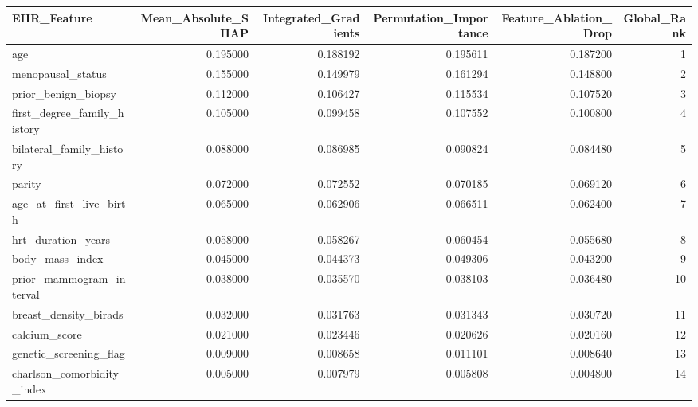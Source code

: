 \begin{tabular}{lrrrrr}
\toprule
EHR_Feature & Mean_Absolute_SHAP & Integrated_Gradients & Permutation_Importance & Feature_Ablation_Drop & Global_Rank \\
\midrule
age & 0.195000 & 0.188192 & 0.195611 & 0.187200 & 1 \\
menopausal_status & 0.155000 & 0.149979 & 0.161294 & 0.148800 & 2 \\
prior_benign_biopsy & 0.112000 & 0.106427 & 0.115534 & 0.107520 & 3 \\
first_degree_family_history & 0.105000 & 0.099458 & 0.107552 & 0.100800 & 4 \\
bilateral_family_history & 0.088000 & 0.086985 & 0.090824 & 0.084480 & 5 \\
parity & 0.072000 & 0.072552 & 0.070185 & 0.069120 & 6 \\
age_at_first_live_birth & 0.065000 & 0.062906 & 0.066511 & 0.062400 & 7 \\
hrt_duration_years & 0.058000 & 0.058267 & 0.060454 & 0.055680 & 8 \\
body_mass_index & 0.045000 & 0.044373 & 0.049306 & 0.043200 & 9 \\
prior_mammogram_interval & 0.038000 & 0.035570 & 0.038103 & 0.036480 & 10 \\
breast_density_birads & 0.032000 & 0.031763 & 0.031343 & 0.030720 & 11 \\
calcium_score & 0.021000 & 0.023446 & 0.020626 & 0.020160 & 12 \\
genetic_screening_flag & 0.009000 & 0.008658 & 0.011101 & 0.008640 & 13 \\
charlson_comorbidity_index & 0.005000 & 0.007979 & 0.005808 & 0.004800 & 14 \\
\bottomrule
\end{tabular}

